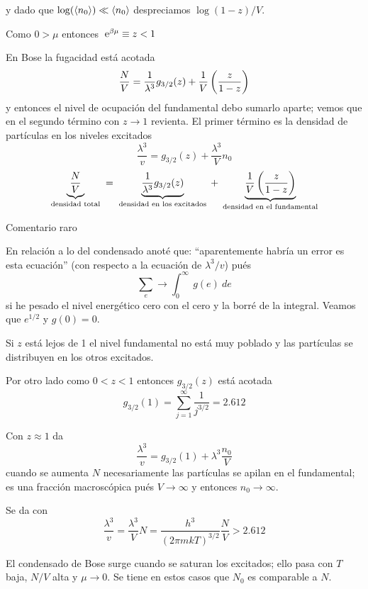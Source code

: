 \documentclass[10pt,oneside]{CBFT_book}
\begin{document}
y dado que $ \log (\braket{n_0}) \ll \braket{n_0} $ despreciamos $ \log (1-z) / V $.

Como $ 0 > \mu $ entonces $ \:\mathrm{e}^{\beta \mu} \equiv z < 1 $

En Bose la fugacidad está acotada
\[
	\frac{N}{V} = \frac{1}{\lambda^3} g_{3/2}(z) + \frac{1}{V}\left( \frac{ z }{ 1-z } \right)
\]
y entonces el nivel de ocupación del fundamental debo sumarlo aparte; vemos que en el
segundo término con $z\to 1$ revienta.
El primer término es la densidad de partículas en los niveles excitados
\[
	\frac{\lambda^3}{v} =  g_{3/2}(z) + \frac{\lambda^3}{V} n_0
\]
\[
	\underbrace{\frac{N}{V}}_{\text{ densidad total }} =
	\underbrace{\frac{1}{\lambda^3} g_{3/2}(z)}_{\text{ densidad en los excitados }} +
	\underbrace{\frac{1}{V}\left( \frac{ z }{ 1-z } \right)}_{\text{ densidad en el fundamental }}
\]

\begin{ejemplo}{Comentario raro}

En relación a lo del condensado anoté que: ``aparentemente habría un error es esta ecuación''
(con respecto a la ecuación de $\lambda^3/v$) pués
\[
	 \sum_e \longrightarrow \int_0^\infty \: g(e) \: de
\]
si he pesado el nivel energético  cero con el cero y la borré de la integral. Veamos que $e^{1/2}$
y $g(0)=0$.
 
\end{ejemplo}

Si $z$ está lejos de 1 el nivel fundamental no está muy poblado y las partículas se distribuyen
en los otros excitados.

Por otro lado como $ 0 < z < 1 $ entonces $ g_{3/2}(z) $ está acotada 
\[
	g_{3/2}(1) = \sum_{j=1}^\infty \frac{1}{j^{3/2}} = 2.612
\]

Con $z\approx 1$ da
\[
	\frac{\lambda^3}{v} = g_{3/2}(1) + \lambda^3 \frac{n_0}{V} 
\]
cuando se aumenta $N$ necesariamente las partículas se apilan en el fundamental; es una
fracción macroscópica pués $ V \to \infty $ y entonces $ n_0 \to \infty $.

Se da con 
\[
	\frac{\lambda^3}{v} = \frac{\lambda^3}{V} N = \frac{h^3}{(2\pi m kT)^{3/2}} \frac{N}{V} > 2.612
\]

El condensado de Bose surge cuando se saturan los excitados; ello pasa con $T$ baja, $N/V$
alta y $ \mu \to 0$. Se tiene en estos casos que $N_0$ es comparable a $N$.
\end{document}
